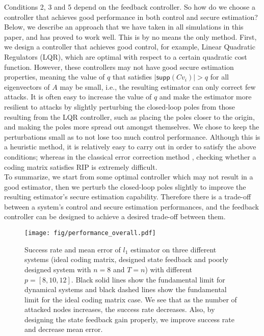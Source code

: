 \documentclass[twocolumn]{autart}    %
\newcommand{\rev}[1]{{\normalsize{{{\color{blue}#1}}}}}
\begin{document}
Conditions 2, 3 and 5 depend on the feedback controller. So how do we choose a controller that achieves good performance in both control and secure estimation? Below, we describe an approach that we have taken in all simulations in this paper, and has proved to work well. This is by no means the only method. First, we design a controller that achieves good control, for example, Linear Quadratic Regulators (LQR), which are optimal with respect to a certain quadratic cost function. However, these controllers may not have good secure estimation properties, meaning the value of $q$ that satisfies $\lvert \textsf{supp} (C v_i) \rvert > q$ for all eigenvectors of $A$ may be small, i.e., the resulting \rev{estimator} can only correct few \rev{attacks}. It is often easy to increase the value of $q$ and make the \rev{estimator} more resilient to attacks by slightly perturbing the closed-loop poles from those resulting from the LQR controller, such as placing the poles closer to the origin, and making the poles more spread out amongst themselves. We chose to keep the perturbations small as to not lose too much control performance.  
Although this is a heuristic method, it is relatively easy to carry out in order to satisfy the above conditions; whereas in the classical error correction method \cite{Candes_Tao}, checking whether a coding matrix satisfies RIP is extremely difficult.
\\
To summarize, we start from some optimal controller which may not result in a good \rev{estimator}, then we perturb the closed-loop poles slightly to improve the resulting \rev{estimator}'s secure estimation capability. Therefore there is a trade-off between a system's control and secure estimation performances, and the feedback controller can be designed to achieve a desired trade-off between them.
\begin{figure}
\center
\texttt{[image: fig/performance\_overall.pdf]}
\caption{Success rate and mean error of $l_1$ \rev{estimator} on three different systems (ideal coding matrix, designed state feedback and poorly designed system with $n=8$ and $T=n$) with different $p=[8,10,12]$. Black solid lines show the fundamental limit for dynamical systems and black dashed lines show the fundamental limit for the ideal coding matrix case. We see that as the number of attacked nodes increases, the success rate decreases. Also, by designing the state feedback gain properly, we improve success rate and decrease mean error. }
\label{fig:ex_n8_overall}
\end{figure}
\vspace{-0.4cm}
\end{document}
